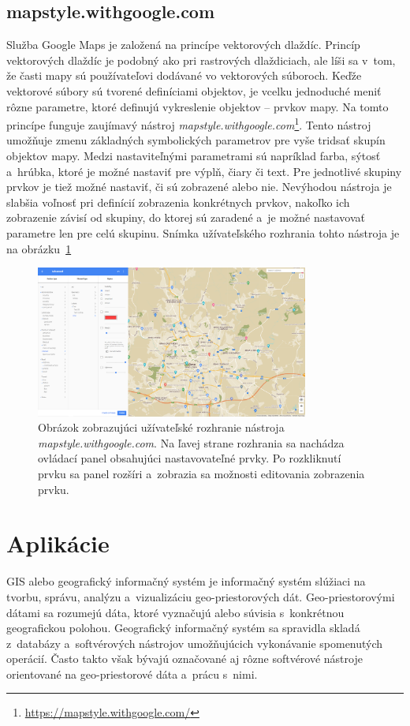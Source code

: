\subsection*{mapstyle.withgoogle.com}
Služba Google Maps je založená na princípe vektorových dlaždíc. Princíp vektorových dlaždíc je podobný ako pri rastrových dlaždiciach, ale líši sa v~tom, že časti mapy sú používateľovi dodávané vo vektorových súboroch. Keďže vektorové súbory sú tvorené definíciami objektov, je vcelku jednoduché meniť rôzne parametre, ktoré definujú vykreslenie objektov -- prvkov mapy. Na tomto princípe funguje zaujímavý nástroj {\it mapstyle.withgoogle.com}\footnote{\url{https://mapstyle.withgoogle.com/}}. Tento nástroj umožňuje zmenu základných symbolických parametrov pre vyše tridsať skupín objektov mapy. Medzi nastaviteľnými parametrami sú napríklad farba, sýtosť a~hrúbka, ktoré je možné nastaviť pre výplň, čiary či text. Pre jednotlivé skupiny prvkov je tiež možné nastaviť, či sú zobrazené alebo nie. Nevýhodou nástroja je slabšia voľnosť pri definícií zobrazenia konkrétnych prvkov, nakoľko ich zobrazenie závisí od skupiny, do ktorej sú zaradené a~je možné nastavovať parametre len pre celú skupinu. Snímka užívateľského rozhrania tohto nástroja je na obrázku~\ref{img_google}

\begin{figure}[hbt]
	\centering
	\includegraphics[width=0.8\textwidth]{obrazky-figures/img_google.png}
	\caption{Obrázok zobrazujúci užívateľské rozhranie nástroja {\it mapstyle.withgoogle.com}. Na ľavej strane rozhrania sa nachádza ovládací panel obsahujúci nastavovateľné prvky. Po rozkliknutí prvku sa panel rozšíri a~zobrazia sa možnosti editovania zobrazenia prvku.}
	\label{img_google}
\end{figure}

\section{Aplikácie}
GIS alebo geografický informačný systém je informačný systém slúžiaci na tvorbu, správu, analýzu a~vizualizáciu geo-priestorových dát. Geo-priestorovými dátami sa rozumejú dáta, ktoré vyznačujú alebo súvisia s~konkrétnou geografickou polohou. Geografický informačný systém sa spravidla skladá z~databázy a~softvérových nástrojov umožňujúcich vykonávanie spomenutých operácií. Často takto však bývajú označované aj rôzne softvérové nástroje orientované na geo-priestorové dáta a~prácu s~nimi.

